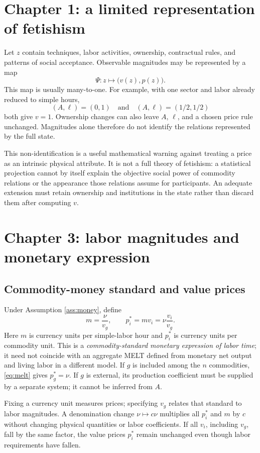 \documentclass[11pt,letterpaper]{article}
\begin{document}
\section{Chapter 1: a limited representation of fetishism}
Let $z$ contain techniques, labor activities, ownership, contractual
rules, and patterns of social acceptance. Observable magnitudes may be
represented by a map
\[
 \Psi:z\longmapsto\bigl(v(z),p(z)\bigr).
\]
This map is usually many-to-one. For example, with one sector and labor
already reduced to simple hours,
\[
 (A,\ell)=(0,1)\quad\text{and}\quad(A,\ell)=(1/2,1/2)
\]
both give $v=1$. Ownership changes can also leave $A$, $\ell$, and a
chosen price rule unchanged. Magnitudes alone therefore do not identify
the relations represented by the full state.

This non-identification is a useful mathematical warning against
treating a price as an intrinsic physical attribute. It is not a full
theory of fetishism: a statistical projection cannot by itself explain
the objective social power of commodity relations or the appearance
those relations assume for participants. An adequate extension must
retain ownership and institutions in the state rather than discard them
after computing $v$.

\section{Chapter 3: labor magnitudes and monetary expression}
\subsection{Commodity-money standard and value prices}
Under Assumption \ref{ass:money}, define
\begin{equation}\label{eq:melt}
 m=\frac{\nu}{v_g},\qquad p_i^*=mv_i=\nu\frac{v_i}{v_g}.
\end{equation}
Here $m$ is currency units per simple-labor hour and $p_i^*$ is currency
units per commodity unit. This is a \emph{commodity-standard monetary
expression of labor time}; it need not coincide with an aggregate MELT
defined from monetary net output and living labor in a different model.
If $g$ is included among the $n$ commodities, \eqref{eq:melt} gives
$p_g^*=\nu$. If $g$ is external, its production coefficient must be
supplied by a separate system; it cannot be inferred from $A$.

Fixing a currency unit measures prices; specifying $v_g$ relates that
standard to labor magnitudes. A denomination change $\nu\mapsto c\nu$
multiplies all $p_i^*$ and $m$ by $c$ without changing physical quantities
or labor coefficients. If all $v_i$, including $v_g$, fall by the same
factor, the value prices $p_i^*$ remain unchanged even though labor
requirements have fallen.
\end{document}

